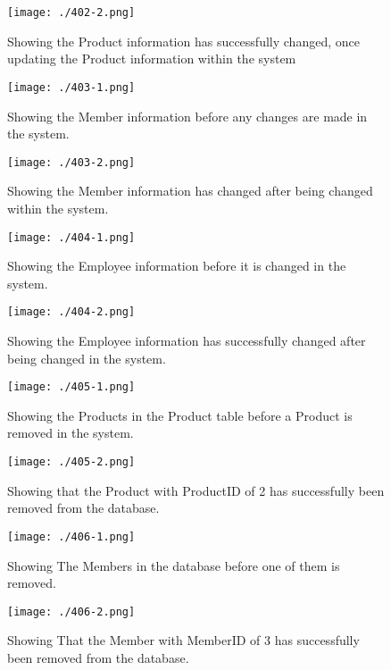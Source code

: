 \begin{figure}[H]
    \texttt{[image: ./402-2.png]}
    \caption{Showing the Product information has successfully changed, once updating the Product information within the system} \label{fig:402-2}
\end{figure}

\begin{figure}[H]
    \texttt{[image: ./403-1.png]}
    \caption{Showing the Member information before any changes are made in the system.} \label{fig:403-1}
\end{figure}

\begin{figure}[H]
    \texttt{[image: ./403-2.png]}
    \caption{Showing the Member information has changed after being changed within the system.} \label{fig:403-2}
\end{figure}

\begin{figure}[H]
    \texttt{[image: ./404-1.png]}
    \caption{Showing the Employee information before it is changed in the system.} \label{fig:404-1}
\end{figure}

\begin{figure}[H]
    \texttt{[image: ./404-2.png]}
    \caption{Showing the Employee information has successfully changed after being changed in the system.} \label{fig:404-2}
\end{figure}

\begin{figure}[H]
    \texttt{[image: ./405-1.png]}
    \caption{Showing the Products in the Product table before a Product is removed in the system.} \label{fig:405-1}
\end{figure}

\begin{figure}[H]
    \texttt{[image: ./405-2.png]}
    \caption{Showing that the Product with ProductID of 2 has successfully been removed from the database.} \label{fig:405-2}
\end{figure}

\begin{figure}[H]
    \texttt{[image: ./406-1.png]}
    \caption{Showing The Members in the database before one of them is removed.} \label{fig:406-1}
\end{figure}

\begin{figure}[H]
    \texttt{[image: ./406-2.png]}
    \caption{Showing That the Member with MemberID of 3 has successfully been removed from the database.} \label{fig:406-2}
\end{figure}

